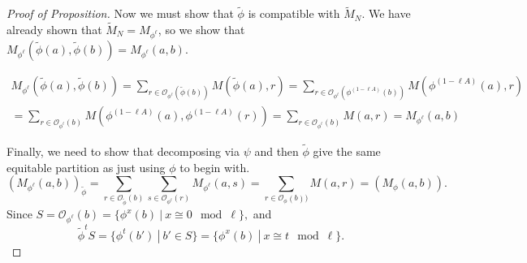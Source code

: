 \documentclass[preprint,12pt]{elsarticle}
\newcommand{\tM}{\tilde{M}}
\newcommand{\tp}{\tilde{\phi}}
\renewcommand{\so}{\mathscr{O}}
\theoremstyle{definition}
\theoremstyle{remark}
\begin{document}
\begin{proof}[Proof of Proposition]
Now we must show that  $\tp$ is compatible with $\tM_N $.  We have already shown that $\tM_N = M_{\phi^\ell}$, so we show that $M_{\phi^\ell}(\tp(a), \tp(b)) = M_{\phi^\ell}(a,b)$.

\[\begin{array}{c}
\displaystyle{
M_{\phi^\ell}(\tp(a), \tp(b)) = \sum_{r \in \so_{\phi^\ell}(\tp(b))} M(\tp(a), r) =
\sum_{r \in \so_{\phi^\ell}(\phi^{(1 - \ell A)}(b))} M(\phi^{(1 - \ell A)}(a), r)}\\[10mm]
\displaystyle{
= \sum_{r \in \so_{\phi^\ell}(b)} M(\phi^{(1 - \ell A)}(a), \phi^{(1 - \ell A)}(r)) = \sum_{r \in \so_{\phi^\ell}(b)} M(a, r) = M_{\phi^\ell}(a,b)
}\end{array}
\]


Finally, we need to show that decomposing via $\psi$ and then $\tp$ give the same equitable partition as just using $\phi$ to begin with.
\[
\left(M_{\phi^\ell}(a,b)\right)_{\tp} =  \sum_{r \in \so_{\tp}(b)}  \sum_{s \in \so_{\phi^\ell}(r)} M_{\phi^\ell}(a,s) = \sum_{r \in \so_{\phi}(b))} M(a,r) =\left(M_{\phi}(a,b)\right) .
\]
Since $S = \so_{\phi^\ell}(b) = \{\phi^x(b) \ | \ x \cong 0 \mod \ell\},$ and
\[
\tp^tS = \{\phi^t(b') \ | \ b' \in S\} = \{\phi^x(b) \ | \ x \cong t \mod \ell\}.
\]



\end{proof}
\end{document}
